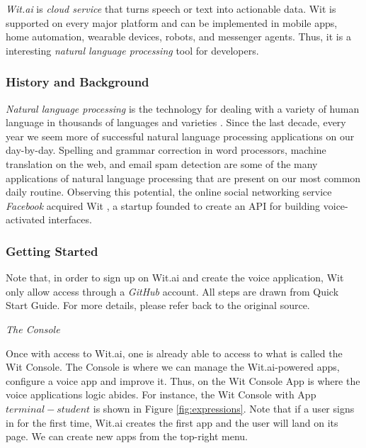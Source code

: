 \emph{Wit.ai} is \emph{cloud service} that turns speech or text into actionable data.
Wit is supported on every major platform and can be implemented in mobile apps, home automation, wearable devices, robots, and messenger agents.
Thus, it is a interesting \emph{natural language processing} tool for developers.

\subsubsection{History and Background}

\emph{Natural language processing} is the technology for dealing with a variety of human language in thousands of languages and varieties \cite{jurafsky2014speech}. 
Since the last decade, every year we seem more of successful natural language processing applications on our day-by-day.
Spelling and grammar correction in word processors, machine translation on the web, and email spam detection are some of the many applications of natural language processing that are present on our most common daily routine.
Observing this potential, the online social networking service \emph{Facebook} acquired Wit \cite{1_wit.ai_2016}, a startup founded to create an API for building voice-activated interfaces. 

\subsubsection{Getting Started}

Note that, in order to sign up on Wit.ai and create the voice application, Wit only allow access through a \emph{GitHub} \cite{github_2016} account.
All steps are drawn from \cite{1_wit.ai_2016} Quick Start Guide.
For more details, please refer back to the original source.

\emph{The Console}

Once with access to Wit.ai, one is already able to access to what is called the Wit Console. 
The Console is where we can manage the Wit.ai-powered apps, configure a voice app and improve it.
Thus, on the Wit Console App is where the voice applications logic abides.
For instance, the Wit Console with App $terminal-student$ is shown in Figure \ref{fig:expressions}.
Note that if a user signs in for the first time, Wit.ai creates the first app and the user will land on its page.
We can create new apps from the top-right menu.

